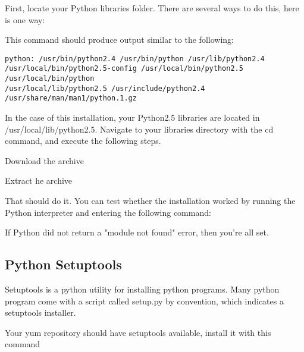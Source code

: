 \vspace{1pc}

First, locate your Python libraries folder.  There are several ways to do this, here is one way:


This command should produce output similar to the following:

\begin {verbatim}
python: /usr/bin/python2.4 /usr/bin/python /usr/lib/python2.4
/usr/local/bin/python2.5-config /usr/local/bin/python2.5 /usr/local/bin/python
/usr/local/lib/python2.5 /usr/include/python2.4 /usr/share/man/man1/python.1.gz
\end{verbatim}

In the case of this installation, your Python2.5 libraries are located in /usr/local/lib/python2.5.  Navigate to your libraries directory with the cd command, and execute the following steps.

\vspace{1pc}

Download the archive


\vspace{1pc}

Extract he archive


\vspace{1pc}

That should do it.  You can test whether the installation worked by running the Python interpreter and entering the following command:


If Python did not return a "module not found" error, then you're all set.

\subsection{Python Setuptools}
Setuptools is a python utility for installing python programs.  Many python program come with a script called setup.py by convention, which indicates a setuptools installer.  

Your yum repository should have setuptools available, install it with this command


